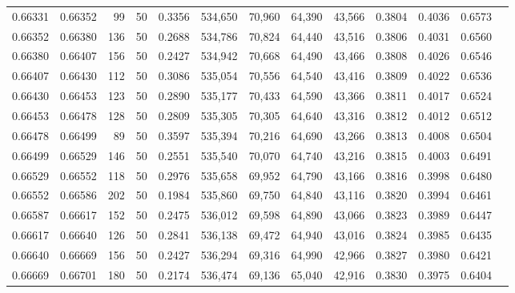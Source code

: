 \begin{tabular}{rrrrrrrrrrrrr}
0.66331 & 0.66352 &    99 &  50 &                                     0.3356 & 534,650 &  70,960 &  64,390 &  43,566 & 0.3804 & 0.4036 & 0.6573 \\
0.66352 & 0.66380 &   136 &  50 &                                     0.2688 & 534,786 &  70,824 &  64,440 &  43,516 & 0.3806 & 0.4031 & 0.6560 \\
0.66380 & 0.66407 &   156 &  50 &                                     0.2427 & 534,942 &  70,668 &  64,490 &  43,466 & 0.3808 & 0.4026 & 0.6546 \\
0.66407 & 0.66430 &   112 &  50 &                                     0.3086 & 535,054 &  70,556 &  64,540 &  43,416 & 0.3809 & 0.4022 & 0.6536 \\
0.66430 & 0.66453 &   123 &  50 &                                     0.2890 & 535,177 &  70,433 &  64,590 &  43,366 & 0.3811 & 0.4017 & 0.6524 \\
0.66453 & 0.66478 &   128 &  50 &                                     0.2809 & 535,305 &  70,305 &  64,640 &  43,316 & 0.3812 & 0.4012 & 0.6512 \\
0.66478 & 0.66499 &    89 &  50 &                                     0.3597 & 535,394 &  70,216 &  64,690 &  43,266 & 0.3813 & 0.4008 & 0.6504 \\
0.66499 & 0.66529 &   146 &  50 &                                     0.2551 & 535,540 &  70,070 &  64,740 &  43,216 & 0.3815 & 0.4003 & 0.6491 \\
0.66529 & 0.66552 &   118 &  50 &                                     0.2976 & 535,658 &  69,952 &  64,790 &  43,166 & 0.3816 & 0.3998 & 0.6480 \\
0.66552 & 0.66586 &   202 &  50 &                                     0.1984 & 535,860 &  69,750 &  64,840 &  43,116 & 0.3820 & 0.3994 & 0.6461 \\
0.66587 & 0.66617 &   152 &  50 &                                     0.2475 & 536,012 &  69,598 &  64,890 &  43,066 & 0.3823 & 0.3989 & 0.6447 \\
0.66617 & 0.66640 &   126 &  50 &                                     0.2841 & 536,138 &  69,472 &  64,940 &  43,016 & 0.3824 & 0.3985 & 0.6435 \\
0.66640 & 0.66669 &   156 &  50 &                                     0.2427 & 536,294 &  69,316 &  64,990 &  42,966 & 0.3827 & 0.3980 & 0.6421 \\
0.66669 & 0.66701 &   180 &  50 &                                     0.2174 & 536,474 &  69,136 &  65,040 &  42,916 & 0.3830 & 0.3975 & 0.6404 \\

\end{tabular}
